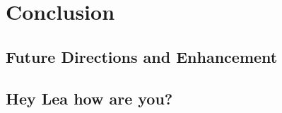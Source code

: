 \section{Conclusion}

\subsection{Future Directions and Enhancement}

\subsection{Hey Lea how are you?}